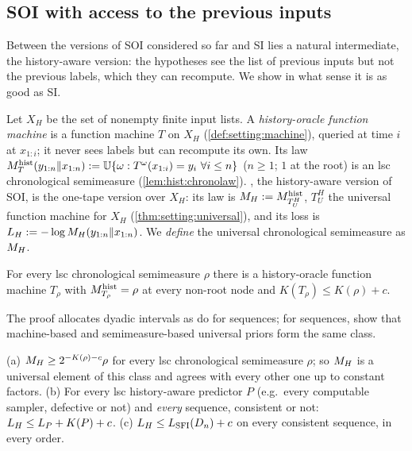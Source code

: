 \subsection{SOI with access to the previous inputs}\label{sec:hist:sfihist}

Between the versions of SOI considered so far and SI lies a natural intermediate, the history-aware version: the hypotheses see the list of previous inputs but not the previous labels, which they can recompute. We show in what sense it is as good as SI.

\begin{definition}[\SFIhist]\label{def:hist:sfihist}
Let $X_H$ be the set of nonempty finite input lists. A \emph{history-oracle function machine} is a function machine $T$ on $X_H$ (\cref{def:setting:machine}), queried at time $i$ at $x_{1:i}$; it never sees labels but can recompute its own. Its law $M^{\rm hist}_T(y_{1:n}\Vert x_{1:n}):=\mathbb{U}\{\omega:T^\omega(x_{1:i})=y_i\ \forall i\le n\}$ ($n\ge1$; $1$ at the root) is an lsc chronological semimeasure (\cref{lem:hist:chronolaw}). \emph{\SFIhist{}}, the history-aware version of SOI, is the one-tape version over $X_H$: its law is $M_{H}:=M^{\rm hist}_{T^H_U}$, $T^H_U$ the universal function machine for $X_H$ (\cref{thm:setting:universal}), and its loss is $L_{H}:=-\log M_{H}(y_{1:n}\Vert x_{1:n})$. We \emph{define} the universal chronological semimeasure as $M_{H}$.
\end{definition}

\begin{theorem}[Representation]\label{thm:hist:representation}
For every lsc chronological semimeasure $\rho$ there is a history-oracle function machine $T_\rho$ with $M^{\rm hist}_{T_\rho}=\rho$ at every non-root node and $K(T_\rho)\le K(\rho)+c$.
\end{theorem}

The proof allocates dyadic intervals as \citet{zvonkin1970complexity} do for sequences; for sequences, \citet{wood2013non} show that machine-based and semimeasure-based universal priors form the same class.

\begin{corollary}\label{cor:hist:H4}
(a) $M_{H}\ge2^{-K(\rho)-c}\rho$ for every lsc chronological semimeasure $\rho$; so $M_{H}$ is a universal element of this class and agrees with every other one up to constant factors.
(b) For every lsc history-aware predictor $P$ (e.g.\ every computable sampler, defective or not) and \emph{every} sequence, consistent or not: $L_{H}\le L_P+K(P)+c$.
(c) $L_{H}\le L_{\mathrm{SFI}}(D_n)+c$ on every consistent sequence, in every order.
\end{corollary}

